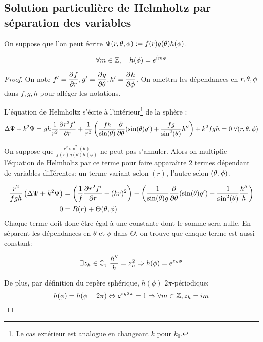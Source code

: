\subsection{Solution particulière de Helmholtz par séparation des variables}
\begin{hyp}
On suppose que l'on peut écrire \(\Psi(\rtp) : = f(r)g(\theta)h(\phi)\). 
\end{hyp}
\begin{prop}
\begin{equation}
\forall m \in \ZZ, \quad h(\phi) = e^{im\phi}
\end{equation}
\end{prop}
\begin{proof}
On note \(f' =\ddr{r}{f}, g' = \ddr{\theta}{g} , h' = \ddr{\phi}{h}\). On omettra les dépendances en \(\rtp\) dans \(f,g,h\) pour alléger les notations.

L'équation de Helmholtz s'écrie à l'intérieur\footnote{Le cas extérieur est analogue en changeant \(k\) pour \(k_0\).} de la sphère : 
\begin{equation}\label{eq:helm:helm}
  \Delta \Psi + k^2 \Psi = gh\frac{1}{r^2}\ddr{r}{r^2f'} + \frac{1}{r^2}\left(\frac{fh}{\sin(\theta)}\ddr{\theta}{}(\sin(\theta)g')+\frac{fg}{\sin^2(\theta)}h''\right) + k^2 fgh = 0 \; \forall (r,\tp)
\end{equation}

On suppose que \( \frac{r^2\sin^2(\theta)}{f(r)g(\theta)h(\phi)}\) ne peut pas s'annuler. Alors on multiplie l'équation de Helmholtz par ce terme pour faire apparaître 2 termes dépendant de variables différentes: un terme variant selon \((r)\), l'autre selon \((\tp)\). 

\begin{align*}
\frac{r^2}{fgh} \left(\Delta \Psi + k^2 \Psi\right) &= 
\left(\frac{1}{f}\ddr{r}{r^2f'} + (kr)^2\right) + 
\left(\frac{1}{ \sin(\theta)g} \ddr{\theta}{}(\sin(\theta)g') +  \frac{1}{ \sin^2(\theta)}\frac{h''}{h} \right)\\
0 &=R(r) + \Theta(\tp)
\end{align*}
Chaque terme doit donc être égal à une constante dont le somme sera nulle. En séparent les dépendances en \(\theta\) et \(\phi\) dans \(\Theta\), on trouve que chaque terme est aussi constant:

\[ 
\exists z_h \in \CC,\; \frac{h''}{h} = z_h^2 \Rightarrow h(\phi) = e^{z_h\phi}
\]

De plus, par définition du repère sphérique, \(h(\phi)\) \(2\pi\)-périodique:
\[
h(\phi) = h(\phi + 2\pi) \Leftrightarrow e^{z_h2\pi}= 1 \Rightarrow \forall m \in \ZZ, z_h = im
\]
\end{proof}

